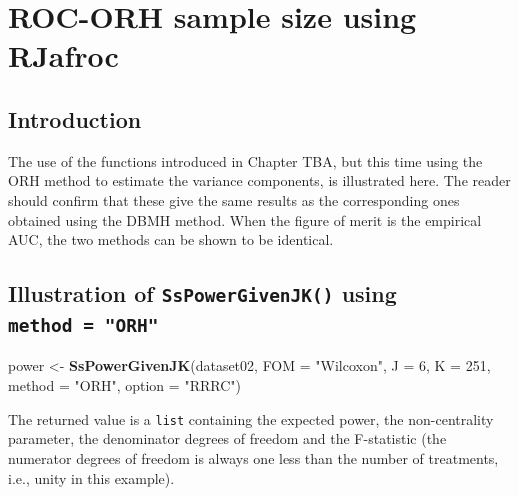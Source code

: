 \documentclass[
]{book}
\newenvironment{Shaded}{\begin{snugshade}}{\end{snugshade}}
\newcommand{\CommentTok}[1]{\textcolor[rgb]{0.56,0.35,0.01}{\textit{#1}}}
\newcommand{\DataTypeTok}[1]{\textcolor[rgb]{0.13,0.29,0.53}{#1}}
\newcommand{\DecValTok}[1]{\textcolor[rgb]{0.00,0.00,0.81}{#1}}
\newcommand{\KeywordTok}[1]{\textcolor[rgb]{0.13,0.29,0.53}{\textbf{#1}}}
\newcommand{\NormalTok}[1]{#1}
\newcommand{\StringTok}[1]{\textcolor[rgb]{0.31,0.60,0.02}{#1}}
\begin{document}
\hypertarget{SSRocORHRJafroc}{%
\chapter{ROC-ORH sample size using RJafroc}\label{SSRocORHRJafroc}}

\hypertarget{introduction-10}{%
\section{Introduction}\label{introduction-10}}

The use of the functions introduced in Chapter TBA, but this time using the ORH method to estimate the variance components, is illustrated here. The reader should confirm that these give the same results as the corresponding ones obtained using the DBMH method. When the figure of merit is the empirical AUC, the two methods can be shown to be identical.

\hypertarget{illustration-of-sspowergivenjk-using-method-orh}{%
\section{\texorpdfstring{Illustration of \texttt{SsPowerGivenJK()} using \texttt{method\ =\ "ORH"}}{Illustration of SsPowerGivenJK() using method = "ORH"}}\label{illustration-of-sspowergivenjk-using-method-orh}}

\begin{Shaded}
\begin{Highlighting}[]
\NormalTok{power \textless{}{-}}\StringTok{ }\KeywordTok{SsPowerGivenJK}\NormalTok{(dataset02, }\DataTypeTok{FOM =} \StringTok{"Wilcoxon"}\NormalTok{, }\DataTypeTok{J =} \DecValTok{6}\NormalTok{, }\DataTypeTok{K =} \DecValTok{251}\NormalTok{, }\DataTypeTok{method =} \StringTok{"ORH"}\NormalTok{, }\DataTypeTok{option =} \StringTok{"RRRC"}\NormalTok{)}
\end{Highlighting}
\end{Shaded}

The returned value is a \texttt{list} containing the expected power, the non-centrality parameter, the denominator degrees of freedom and the F-statistic (the numerator degrees of freedom is always one less than the number of treatments, i.e., unity in this example).

\begin{Shaded}
\end{Shaded}
\end{document}

